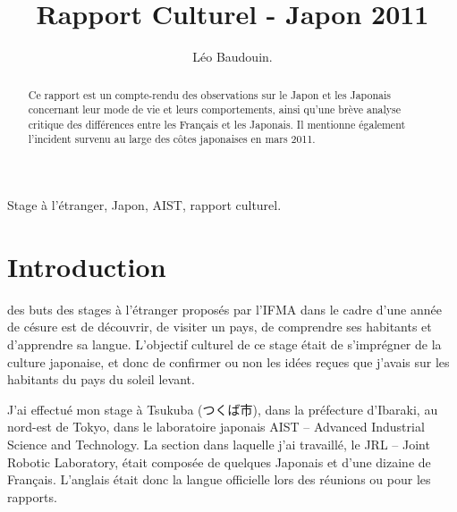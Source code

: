 \documentclass[11pt,journal]{RapportFR}
\begin{document}
\begin{CJK*}{UTF8}{min}

\title{Rapport Culturel - Japon 2011}


\author{L\'{e}o Baudouin.
}


\maketitle


\begin{abstract}
\boldmath
Ce rapport est un compte-rendu des observations sur le Japon et les Japonais concernant leur mode de vie et leurs comportements, ainsi qu'une br\`eve analyse critique des diff\'erences entre les Fran\c cais et les Japonais. Il mentionne \'egalement l'incident survenu au large des c\^otes japonaises en mars 2011.

\end{abstract}

\begin{IEEEkeywords}
Stage \`a l'\'etranger, Japon, AIST, rapport culturel.
\end{IEEEkeywords}



\section{Introduction}


 des buts des stages \`a l'\'etranger propos\'es par l'IFMA dans le cadre d'une ann\'ee de c\'esure est de d\'ecouvrir, de visiter un pays, de comprendre ses habitants et d'apprendre sa langue.
L'objectif culturel de ce stage \'etait de s'impr\'egner de la culture japonaise, et donc de confirmer ou non les id\'ees re\c cues que j'avais sur les habitants du pays du soleil levant.

J'ai effectu\'e mon stage \`a Tsukuba (つくば市), dans la pr\'efecture d'Ibaraki, au nord-est de Tokyo, dans le laboratoire japonais AIST -- Advanced Industrial Science and Technology. La section dans laquelle j'ai travaill\'e, le JRL -- Joint Robotic Laboratory, \'etait compos\'ee de quelques Japonais et d'une dizaine de Fran\c cais. L'anglais \'etait donc la langue officielle lors des r\'eunions ou pour les rapports. 



\end{CJK*}
\end{document}
